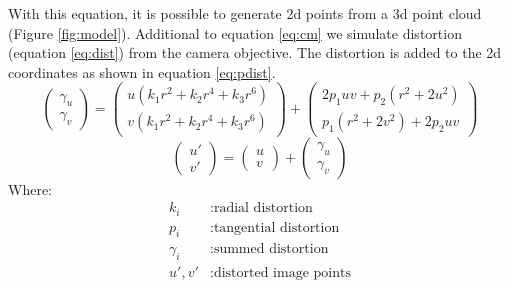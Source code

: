 \documentclass[conference,nofonttune]{IEEEtran}
\begin{document}
With this equation, it is possible to generate 2d points from a 3d point cloud (Figure \ref{fig:model}).
Additional to equation \ref{eq:cm} we simulate distortion (equation \ref{eq:dist}) from the camera objective. The distortion is added to the 2d coordinates as shown in equation \ref{eq:pdist}.\\
\scriptsize
\begin{equation}\label{eq:dist}
	\begin{pmatrix}\gamma_{u} \\
	  \gamma_{v}
	\end{pmatrix}=\begin{pmatrix}
	  u(k_1r^2+k_2r^4+k_3r^6)\\
	  v(k_1r^2+k_2r^4+k_3r^6)
	\end{pmatrix}+\begin{pmatrix}
	  2p_1uv+p_2(r^2+2u^2)\\
	  p_1(r^2+2v^2)+2p_2uv
	\end{pmatrix}
\end{equation}
\begin{equation}\label{eq:pdist}
\begin{pmatrix}u'\\v'\end{pmatrix}=\begin{pmatrix}
u\\v\end{pmatrix}+\begin{pmatrix}\gamma_{u}\\\gamma_{v}\end{pmatrix}
\end{equation}
\normalsize
Where:
\begin{align*}
  k_{i}		&: \text{radial distortion}\\
  p_{i}	    	&: \text{tangential distortion}\\
  \gamma_{i}	&: \text{summed distortion}\\
  u',v'		&: \text{distorted image points}
\end{align*}
\end{document}
